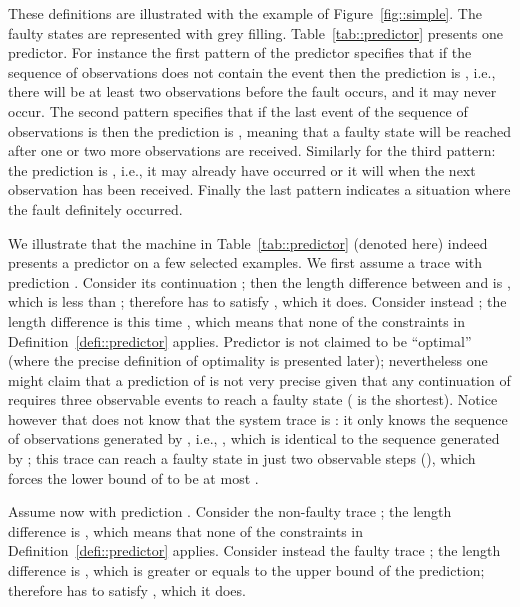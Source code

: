 \documentclass{article}
\begin{document}
These definitions are illustrated 
with the example of Figure~\ref{fig::simple}.  
The faulty states are represented with grey filling.  
Table~\ref{tab::predictor} presents one predictor.  
For instance the first pattern of the predictor specifies 
that if the sequence of observations does not contain the event  
then the prediction is , 
i.e., there will be at least two observations 
before the fault occurs, and it may never occur.  
The second pattern specifies 
that if the last event of the sequence of observations is  
then the prediction is , meaning that a faulty state 
will be reached after one or two more observations are received.  
Similarly for the third pattern: the prediction is , 
i.e., it may already have occurred or it will 
when the next observation has been received.  
Finally the last pattern indicates a situation 
where the fault definitely occurred.  

We illustrate that the machine in Table~\ref{tab::predictor} 
(denoted  here)
indeed presents a predictor on a few selected examples.  
We first assume a trace  
with prediction .  
Consider its continuation ; 
then the length difference between  and  is , 
which is less than ; 
therefore  has to satisfy , 
which it does.  
Consider instead ; 
the length difference is this time , 
which means that none of the constraints 
in Definition~\ref{defi::predictor} applies.  
Predictor  is not claimed to be ``optimal'' 
(where the precise definition of optimality is presented later); 
nevertheless one might claim 
that a prediction of  is not very precise 
given that any continuation of  requires three observable events 
to reach a faulty state ( is the shortest).  
Notice however that  does not know that the system trace is : 
it only knows the sequence of observations generated by , 
i.e., , which is identical to the sequence 
generated by ; 
this trace  can reach a faulty state in just two observable steps 
(), which forces the lower bound of  to be at most .  

Assume now  with prediction .  
Consider the non-faulty trace ; 
the length difference is , 
which means that none of the constraints 
in Definition~\ref{defi::predictor} applies.  
Consider instead the faulty trace ; 
the length difference is , 
which is greater or equals to the upper bound of the prediction; 
therefore  has to satisfy , 
which it does.  
\end{document}
